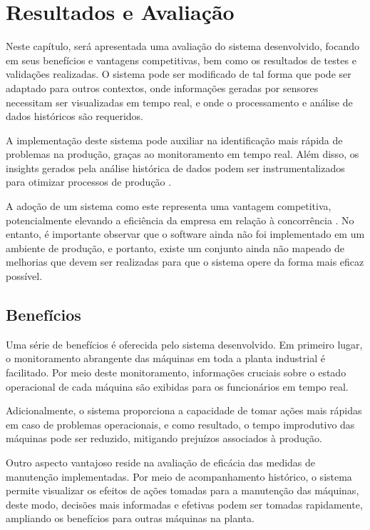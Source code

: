 \chapter{Resultados e Avaliação}\label{cap:results}

Neste capítulo, será apresentada uma avaliação do sistema desenvolvido, focando em seus benefícios e vantagens competitivas, bem como os resultados de testes e validações realizadas. O sistema pode ser modificado de tal forma que pode ser adaptado para outros contextos, onde informações geradas por sensores necessitam ser visualizadas em tempo real, e onde o processamento e análise de dados históricos são requeridos.

A implementação deste sistema pode auxiliar na identificação mais rápida de problemas na produção, graças ao monitoramento em tempo real. Além disso, os insights gerados pela análise histórica de dados podem ser instrumentalizados para otimizar processos de produção \cite{raczSzabo2020realTime}. 

A adoção de um sistema como este representa uma vantagem competitiva, potencialmente elevando a eficiência da empresa em relação à concorrência \cite{ng2011realTime}. No entanto, é importante observar que o software ainda não foi implementado em um ambiente de produção, e portanto, existe um conjunto ainda não mapeado de melhorias que devem ser realizadas para que o sistema opere da forma mais eficaz possível.


\section{Benefícios}\label{sec:benfits}

Uma série de benefícios é oferecida pelo sistema desenvolvido. Em primeiro lugar, o monitoramento abrangente das máquinas em toda a planta industrial é facilitado. Por meio deste monitoramento, informações cruciais sobre o estado operacional de cada máquina são exibidas para os funcionários em tempo real.

Adicionalmente, o sistema proporciona a capacidade de tomar ações mais rápidas em caso de problemas operacionais, e como resultado, o tempo improdutivo das máquinas pode ser reduzido, mitigando prejuízos associados à produção.

Outro aspecto vantajoso reside na avaliação de eficácia das medidas de manutenção implementadas. Por meio de acompanhamento histórico, o sistema permite visualizar os efeitos de ações tomadas para a manutenção das máquinas, deste modo, decisões mais informadas e efetivas podem ser tomadas rapidamente, ampliando os benefícios para outras máquinas na planta.

